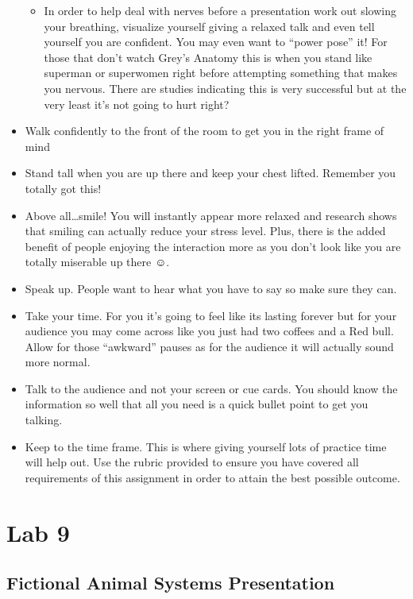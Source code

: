\documentclass[
]{book}
\providecommand{\tightlist}{%
  \setlength{\itemsep}{0pt}\setlength{\parskip}{0pt}}
\begin{document}
\begin{itemize}
  \begin{itemize}
  \tightlist
  \item
    In order to help deal with nerves before a presentation work out slowing your breathing, visualize yourself giving a relaxed talk and even tell yourself you are confident. You may even want to ``power pose'' it! For those that don't watch
    Grey's Anatomy this is when you stand like superman or superwomen right before attempting something that makes you nervous. There are studies indicating this is very successful but at the very least it's not going to hurt right?
  \end{itemize}
\item
  Walk confidently to the front of the room to get you in the right frame of mind
\item
  Stand tall when you are up there and keep your chest lifted. Remember you totally got this!
\item
  Above all\ldots smile! You will instantly appear more relaxed and research shows that smiling can actually reduce your stress level. Plus, there is the added benefit of people enjoying the interaction more as you don't look like you are totally miserable up there ☺.
\item
  Speak up. People want to hear what you have to say so make sure they can.
\item
  Take your time. For you it's going to feel like its lasting forever but for your audience you may come across like you just had two coffees and a Red bull. Allow for those ``awkward'' pauses as for the audience it will actually sound more normal.
\item
  Talk to the audience and not your screen or cue cards. You should know the information so well that all you need is a quick bullet point to get you talking.
\item
  Keep to the time frame. This is where giving yourself lots of practice time will help out.
  Use the rubric provided to ensure you have covered all requirements of this assignment in order to attain the best possible outcome.
\end{itemize}

\hypertarget{part-lab-9}{%
\part*{Lab 9}\label{part-lab-9}}

\hypertarget{fictional-animal-systems-presentation}{%
\chapter*{Fictional Animal Systems Presentation}\label{fictional-animal-systems-presentation}}
\end{document}
